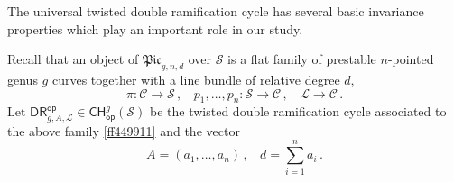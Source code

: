 \documentclass[a4paper,12pt]{article} %
\theoremstyle{definition}
\theoremstyle{plain}%
\newcommand{\Picabs}{\mathfrak{Pic}}
\newcommand{\jocomment}[1]{}
\newcommand{\Dcomment}[1]{}
\begin{document}


The 
universal twisted double ramification cycle has several
basic invariance properties 
which play 
an important role in our study. 

Recall that an object of $\Picabs_{g,n,d}$ over $\mathcal{S}$ is
a flat family  of prestable
    $n$-pointed genus $g$ curves together with a line bundle
    of relative degree $d$,
    \begin{equation}
    \label{ff449911}    
    \pi:\mathcal{C} \rightarrow \mathcal{S}\, , \ \ \ \ p_1,\ldots,p_n: \mathcal{S} \rightarrow \mathcal{C}\, , \ \ \ \
        \mathcal{L} \rightarrow \mathcal{C}\, .
        \end{equation}
    Let $\mathsf{DR}^{\mathsf{op}}_{g,A,\mathcal{L}}\in \mathsf{CH}^g_{\mathsf{op}}(\mathcal{S})$
    be the twisted double ramification cycle associated to the above
    family \eqref{ff449911} and
     the vector
    $$A=(a_1,\ldots, a_n)\, , \ \ \ \ d =\sum_{i=1}^n a_i\, .$$
\end{document}
